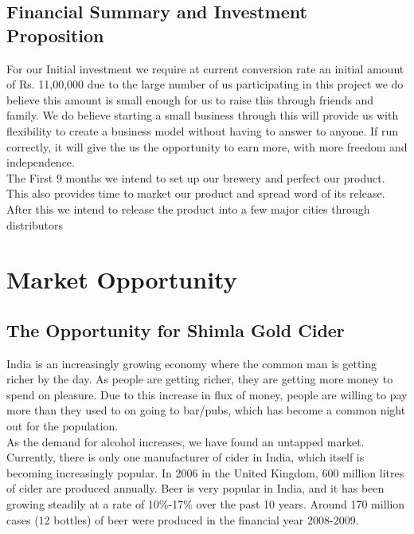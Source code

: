 \documentclass[11pt]{article}
\begin{document}
  \subsection{Financial Summary and Investment Proposition}
     For our Initial investment we require at current conversion rate an initial amount of Rs. 11,00,000 due to the large number of us participating in this project we do believe this amount is small enough for us to raise this through friends and family. We do believe starting a small business through this will provide us with flexibility to create a business model without having to answer to anyone. If run correctly, it will give the us the opportunity to earn more, with more freedom and independence.\\
     The First 9 months we intend to set up our brewery and perfect our product. This also provides time to market our product and spread word of its release. After this we intend to release the product into a few major cities through distributors

\newpage
\section{Market Opportunity}
  \subsection{The Opportunity for Shimla Gold Cider}

India is an increasingly growing economy where the common man is getting richer by the day. As people are getting richer, they are getting more money to spend on pleasure. Due to this increase in flux of money, people are willing to pay more than they used to on going to bar/pubs, which has become a common night out for the population. \\

\noindent As the demand for alcohol increases, we have found an untapped market. Currently, there is only one manufacturer of cider in India, which itself is becoming increasingly popular. In 2006 in the United Kingdom, 600 million litres of cider are produced annually. Beer is very popular in India, and it has been growing steadily at a rate of 10\%-17\% over the past 10 years. Around 170 million cases (12 bottles) of beer were produced in the financial year 2008-2009. \\
\end{document}
